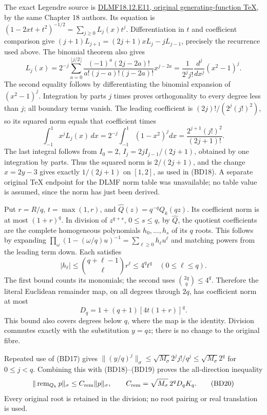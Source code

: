 \documentclass[11pt]{article}
\begin{document}
The exact Legendre source is \href{https://dlmf.nist.gov/18.12.E11.tex}{DLMF18.12.E11, original generating-function TeX}, by the same Chapter 18 authors. Its equation is \((1-2xt+t^2)^{-1/2}=\sum_{j\ge0}L_j(x)t^j\). Differentiation in \(t\) and coefficient comparison give \((j+1)L_{j+1}=(2j+1)xL_j-jL_{j-1}\), precisely the recurrence used above. The binomial theorem also gives \[
L_j(x)=2^{-j}\sum_{a=0}^{\lfloor j/2\rfloor}
\frac{(-1)^a(2j-2a)!}{a!(j-a)!(j-2a)!}x^{j-2a}
=\frac1{2^jj!}\frac{d^j}{dx^j}(x^2-1)^j.
\] The second equality follows by differentiating the binomial expansion of \((x^2-1)^j\). Integration by parts \(j\) times proves orthogonality to every degree less than \(j\); all boundary terms vanish. The leading coefficient is \((2j)!/(2^j(j!)^2)\), so its squared norm equals that coefficient times \[
\int_{-1}^1x^jL_j(x)\,dx
=2^{-j}\int_{-1}^1(1-x^2)^jdx
=\frac{2^{j+1}(j!)^2}{(2j+1)!}.
\] The last integral follows from \(I_0=2\), \(I_j=2jI_{j-1}/(2j+1)\), obtained by one integration by parts. Thus the squared norm is \(2/(2j+1)\), and the change \(x=2y-3\) gives exactly \(1/(2j+1)\) on \([1,2]\), as used in (BD18). A separate original TeX endpoint for the DLMF norm table was unavailable; no table value is assumed, since the norm has just been derived.

Put \(r=R/q\), \(t=\max(1,r)\), and \(\widehat Q(z)=q^{-q}Q_k(qz)\). Its coefficient norm is at most \((1+r)^q\). In division of \(z^{q+s}\), \(0\le s\le q\), by \(\widehat Q\), the quotient coefficients are the complete homogeneous polynomials \(h_0,\ldots,h_s\) of its \(q\) roots. This follows by expanding \(\prod_\omega(1-(\omega/q)u)^{-1}=\sum_{\ell\ge0}h_\ell u^\ell\) and matching powers from the leading term down. Each satisfies \[
|h_\ell|\le\binom{q+\ell-1}{\ell}r^\ell\le4^qt^q
\quad(0\le\ell\le q).
\] The first bound counts its monomials; the second uses \(\binom{2q}{q}\le4^q\). Therefore the literal Euclidean remainder map, on all degrees through \(2q\), has coefficient norm at most \[
D_q=1+(q+1)[4t(1+r)]^q. \tag{BD19}
\] This bound also covers degrees below \(q\), where the map is the identity. Division commutes exactly with the substitution \(y=qz\); there is no change to the original fibre.

Repeated use of (BD17) gives \(\|(y/q)^j\|_\sigma\le\sqrt{M_\sigma}2^jj!/q^j\le\sqrt{M_\sigma}2^q\) for \(0\le j<q\). Combining this with (BD18)--(BD19) proves the all-direction inequality \[
\|\operatorname{rem}_{Q_k}p\|_\sigma
\le C_{\rm rem}\|p\|_\sigma,\qquad
C_{\rm rem}=\sqrt{M_\sigma}\,2^qD_qK_q. \tag{BD20}
\] Every original root is retained in the division; no root pairing or real translation is used.
\end{document}
